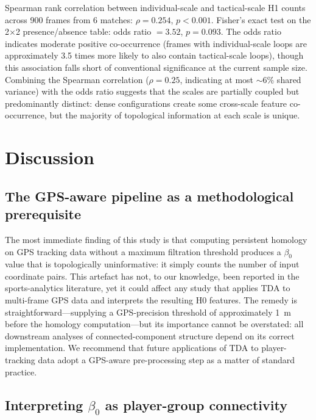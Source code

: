 \documentclass[11pt,a4paper]{article}
\begin{document}
Spearman rank correlation between individual-scale and
tactical-scale H1 counts across 900 frames from 6 matches:
\(\rho = 0.254\), \(p < 0.001\).  Fisher's exact test on the
2\(\times\)2 presence/absence table: odds ratio \(= 3.52\),
\(p = 0.093\).  The odds ratio indicates moderate positive
co-occurrence (frames with individual-scale loops are
approximately 3.5 times more likely to also contain
tactical-scale loops), though this association falls short of
conventional significance at the current sample size.
Combining the Spearman correlation (\(\rho = 0.25\),
indicating at most \(\sim\)6\% shared variance) with the
odds ratio suggests that the scales are partially coupled but
predominantly distinct: dense configurations create some
cross-scale feature co-occurrence, but the majority of
topological information at each scale is unique.

\section{Discussion}
\label{sec:discussion}

\subsection{The GPS-aware pipeline as a methodological
            prerequisite}

The most immediate finding of this study is that computing
persistent homology on GPS tracking data without a maximum
filtration threshold produces a \(\beta_0\) value that is
topologically uninformative: it simply counts the number of
input coordinate pairs.  This artefact has not, to our
knowledge, been reported in the sports-analytics literature,
yet it could affect any study that applies TDA to multi-frame
GPS data and interprets the resulting H0 features.  The
remedy is straightforward---supplying a GPS-precision
threshold of approximately 1~m before the homology
computation---but its importance cannot be overstated: all
downstream analyses of connected-component structure
depend on its correct implementation.  We recommend that
future applications of TDA to player-tracking data adopt a
GPS-aware pre-processing step as a matter of standard
practice.

\subsection{Interpreting \(\beta_0\) as player-group
            connectivity}
\end{document}
